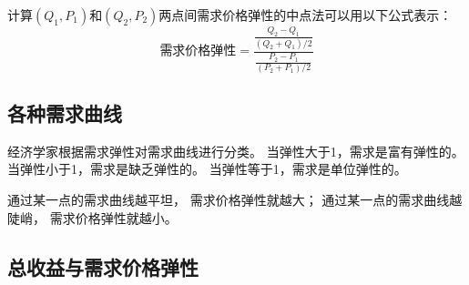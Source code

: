 计算$(Q_1,P_1)$和$(Q_2,P_2)$两点间需求价格弹性的中点法可以用以下公式表示：
\begin{equation}
  \text{需求价格弹性} =
  \frac{
    \frac{Q_2-Q_1}{(Q_2+Q_1)/2}
  }{
    \frac{P_2-P_1}{(P_2+P_1)/2}
  }
\end{equation}


\subsection{各种需求曲线}

经济学家根据需求弹性对需求曲线进行分类。
当弹性大于1，需求是富有弹性的。
当弹性小于1，需求是缺乏弹性的。
当弹性等于1，需求是单位弹性的。



通过某一点的需求曲线越平坦，
需求价格弹性就越大；
通过某一点的需求曲线越陡峭，
需求价格弹性就越小。



\subsection{总收益与需求价格弹性}

